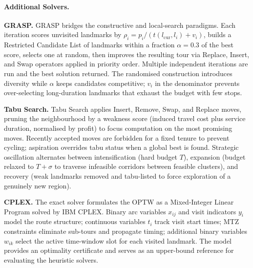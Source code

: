 \paragraph{Additional Solvers.}

\textbf{GRASP.} GRASP bridges the constructive and local-search paradigms. Each iteration scores unvisited landmarks by $\rho_i = p_i/(t(l_{\mathrm{cur}},l_i)+v_i)$, builds a Restricted Candidate List of landmarks within a fraction $\alpha=0.3$ of the best score, selects one at random, then improves the resulting tour via Replace, Insert, and Swap operators applied in priority order. Multiple independent iterations are run and the best solution returned. The randomised construction introduces diversity while $\alpha$ keeps candidates competitive; $v_i$ in the denominator prevents over-selecting long-duration landmarks that exhaust the budget with few stops.

\textbf{Tabu Search.} Tabu Search applies Insert, Remove, Swap, and Replace moves, pruning the neighbourhood by a weakness score (induced travel cost plus service duration, normalised by profit) to focus computation on the most promising moves. Recently accepted moves are forbidden for a fixed tenure to prevent cycling; aspiration overrides tabu status when a global best is found. Strategic oscillation alternates between intensification (hard budget $T$), expansion (budget relaxed to $T+\sigma$ to traverse infeasible corridors between feasible clusters), and recovery (weak landmarks removed and tabu-listed to force exploration of a genuinely new region).

\textbf{CPLEX.} The exact solver formulates the OPTW as a Mixed-Integer Linear Program solved by IBM CPLEX. Binary arc variables $x_{ij}$ and visit indicators $y_i$ model the route structure; continuous variables $t_i$ track visit start times; MTZ constraints eliminate sub-tours and propagate timing; additional binary variables $w_{ik}$ select the active time-window slot for each visited landmark. The model provides an optimality certificate and serves as an upper-bound reference for evaluating the heuristic solvers.
